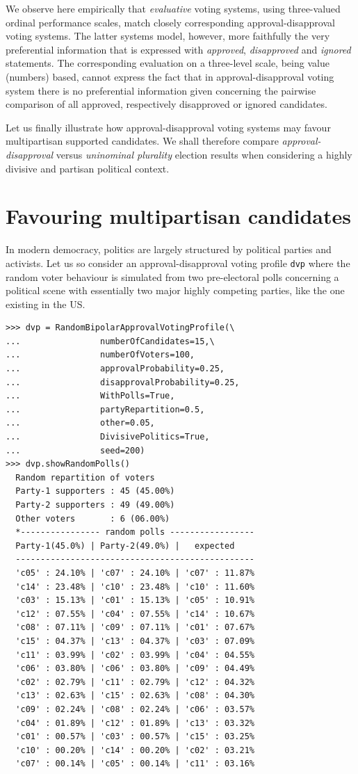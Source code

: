 We observe here empirically that \emph{evaluative} voting systems, using three-valued ordinal performance scales, match closely corresponding approval-disapproval voting systems. The latter systems model, however, more faithfully the very preferential information that is expressed with \emph{approved}, \emph{disapproved} and \emph{ignored} statements. The corresponding evaluation on a three-level scale, being value (numbers) based, cannot express the fact that in approval-disapproval voting system there is no preferential information given concerning the pairwise comparison of all approved, respectively disapproved or ignored candidates.

Let us finally illustrate how approval-disapproval voting systems may favour multipartisan supported candidates. We shall therefore compare \emph{approval-disapproval} versus \emph{uninominal plurality} election results when considering a highly divisive and partisan political context.
 
\section{Favouring multipartisan candidates}
\label{sec:20.5}

In modern democracy, politics  are largely structured by political parties and activists. Let us so consider an approval-disapproval voting profile \texttt{dvp} where the random voter behaviour is simulated from two pre-electoral polls concerning a political scene with essentially two major highly competing parties, like the one existing in the US.
\begin{lstlisting}[caption={A random approval-disapproval voting profile in a divisive political context},label=list:20.15]
>>> dvp = RandomBipolarApprovalVotingProfile(\
...                numberOfCandidates=15,\
...                numberOfVoters=100,
...                approvalProbability=0.25,
...                disapprovalProbability=0.25,
...                WithPolls=True,
...                partyRepartition=0.5,
...                other=0.05,
...                DivisivePolitics=True,
...                seed=200)
>>> dvp.showRandomPolls()
  Random repartition of voters
  Party-1 supporters : 45 (45.00%)
  Party-2 supporters : 49 (49.00%)
  Other voters       : 6 (06.00%)
  *---------------- random polls -----------------
  Party-1(45.0%) | Party-2(49.0%) |   expected  
  ------------------------------------------------
  'c05' : 24.10% | 'c07' : 24.10% | 'c07' : 11.87%
  'c14' : 23.48% | 'c10' : 23.48% | 'c10' : 11.60%
  'c03' : 15.13% | 'c01' : 15.13% | 'c05' : 10.91%
  'c12' : 07.55% | 'c04' : 07.55% | 'c14' : 10.67%
  'c08' : 07.11% | 'c09' : 07.11% | 'c01' : 07.67%
  'c15' : 04.37% | 'c13' : 04.37% | 'c03' : 07.09%
  'c11' : 03.99% | 'c02' : 03.99% | 'c04' : 04.55%
  'c06' : 03.80% | 'c06' : 03.80% | 'c09' : 04.49%
  'c02' : 02.79% | 'c11' : 02.79% | 'c12' : 04.32%
  'c13' : 02.63% | 'c15' : 02.63% | 'c08' : 04.30%
  'c09' : 02.24% | 'c08' : 02.24% | 'c06' : 03.57%
  'c04' : 01.89% | 'c12' : 01.89% | 'c13' : 03.32%
  'c01' : 00.57% | 'c03' : 00.57% | 'c15' : 03.25%
  'c10' : 00.20% | 'c14' : 00.20% | 'c02' : 03.21%
  'c07' : 00.14% | 'c05' : 00.14% | 'c11' : 03.16%
\end{lstlisting}   

